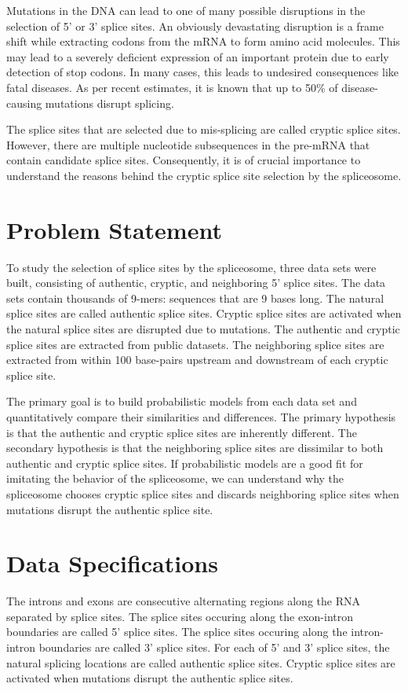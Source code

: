 \documentclass[12pt,a4paper]{article}
\begin{document}
	Mutations in the DNA can lead to one of many possible disruptions in the selection of 5’ or 3’ splice sites. An obviously devastating disruption is a frame shift while extracting codons from the mRNA to form amino acid molecules. This may lead to a severely deficient expression of an important protein due to early detection of stop codons. In many cases, this leads to undesired consequences like fatal diseases. As per recent estimates, it is known that up to 50\% of disease-causing mutations disrupt splicing. \par
	The splice sites that are selected due to mis-splicing are called cryptic splice sites. However, there are multiple nucleotide subsequences in the pre-mRNA that contain candidate splice sites. Consequently, it is of crucial importance to understand the reasons behind the cryptic splice site selection by the spliceosome.
	

	\section{\large Problem Statement} \label{sec:problem}
	To study the selection of splice sites by the spliceosome, three data sets were built, consisting of authentic, cryptic, and neighboring 5’ splice sites. The data sets contain thousands of 9-mers: sequences that are 9 bases long. The natural splice sites are called authentic splice sites. Cryptic splice sites are activated when the natural splice sites are disrupted due to mutations. The authentic and cryptic splice sites are extracted from public datasets. The neighboring splice sites are extracted from within 100 base-pairs upstream and downstream of each cryptic splice site. \par
	The primary goal is to build probabilistic models from each data set and quantitatively compare their similarities and differences. The primary hypothesis is that the authentic and cryptic splice sites are inherently different. The secondary hypothesis is that the neighboring splice sites are dissimilar to both authentic and cryptic splice sites. If probabilistic models are a good fit for imitating the behavior of the spliceosome, we can understand why the spliceosome chooses cryptic splice sites and discards neighboring splice sites when mutations disrupt the authentic splice site.
    
    \section{Data Specifications} \label{sec-dataspec}
    The introns and exons are consecutive alternating regions along the RNA separated by splice sites. The splice sites occuring along the exon-intron boundaries are called 5' splice sites. The splice sites occuring along the intron-intron boundaries are called 3' splice sites. For each of 5' and 3' splice sites, the natural splicing locations are called authentic splice sites. Cryptic splice sites are activated when mutations disrupt the authentic splice sites.
\end{document}
